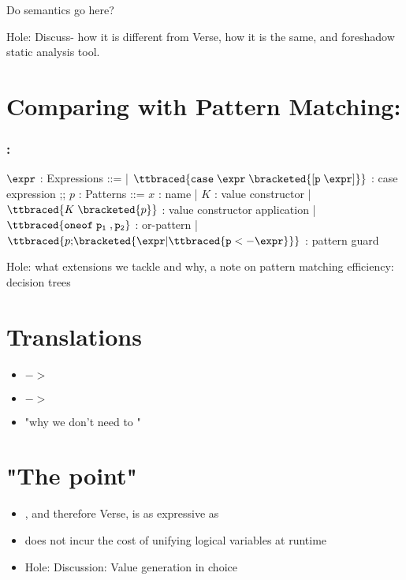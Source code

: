 \documentclass[]{article}
\begin{document}
    Do semantics go here? 

    Hole: Discuss- how it is different from Verse, how it is the same, and
    foreshadow static analysis tool. 
\section{Comparing with Pattern Matching: \Pplus}

\subsubsection{\Pplus:}
\begin{center}
    \begin{bnf}
$\expr$ : \textsf{Expressions} ::=
    | $\ttbraced{\tt{case} \; \expr \; \bracketed{\tt{[} p \; \expr \tt{]}}}$ : case expression 
    ;;
    $p$ : \textsf{Patterns} ::= $x$ : name 
    | $K$ : value constructor 
    | $\ttbraced{K \; \bracketed{p}}$ : value constructor application 
    | $\ttbraced{\tt{oneof} \; p_{1} \;, p_{2} }$ : or-pattern 
    | $\ttbraced{p \tt{;} \bracketed{\expr \vert \ttbraced{p  <- \expr}}}$ : pattern guard
    \end{bnf}
\end{center}
    Hole: what extensions we tackle and why, a note on pattern matching
     efficiency: decision trees

\section{Translations}

\begin{itemize}
    \item \Pplus $->$ \Vminus 
    \item \Vminus $->$ \D
    \item "why we don't need \Pplus to \D"
\end{itemize}

\section{"The point"}


\begin{itemize}
    \item \Vminus, and therefore Verse, is as expressive as \Pplus
    \item \Vminus does not incur the cost of unifying logical variables at runtime 
    \item Hole: Discussion: Value generation in choice 
\end{itemize}
\end{document}

